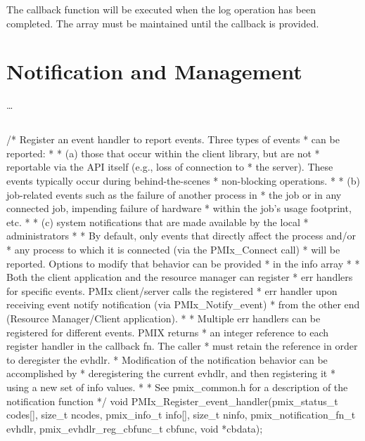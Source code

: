 The callback function will be executed when the log operation has been completed.
The  array must be maintained until the callback is provided.


\section{Notification and Management}
\label{chap:api_event:notify}

\ldots


\subsection{}

\cspecificstart
\begin{codepar}
/* Register an event handler to report events. Three types of events
 * can be reported:
 *
 * (a) those that occur within the client library, but are not
 *     reportable via the API itself (e.g., loss of connection to
 *     the server). These events typically occur during behind-the-scenes
 *     non-blocking operations.
 *
 * (b) job-related events such as the failure of another process in
 *     the job or in any connected job, impending failure of hardware
 *     within the job's usage footprint, etc.
 *
 * (c) system notifications that are made available by the local
 *     administrators
 *
 * By default, only events that directly affect the process and/or
 * any process to which it is connected (via the PMIx_Connect call)
 * will be reported. Options to modify that behavior can be provided
 * in the info array
 *
 * Both the client application and the resource manager can register
 * err handlers for specific events. PMIx client/server calls the registered
 * err handler upon receiving event notify notification (via PMIx_Notify_event)
 * from the other end (Resource Manager/Client application).
 *
 * Multiple err handlers can be registered for different events. PMIX returns
 * an integer reference to each register handler in the callback fn. The caller
 * must retain the reference in order to deregister the evhdlr.
 * Modification of the notification behavior can be accomplished by
 * deregistering the current evhdlr, and then registering it
 * using a new set of info values.
 *
 * See pmix_common.h for a description of the notification function */
void
PMIx_Register_event_handler(pmix_status_t codes[], size_t ncodes,
                            pmix_info_t info[], size_t ninfo,
                            pmix_notification_fn_t evhdlr,
                            pmix_evhdlr_reg_cbfunc_t cbfunc,
                            void *cbdata);
\end{codepar}
\cspecificend


